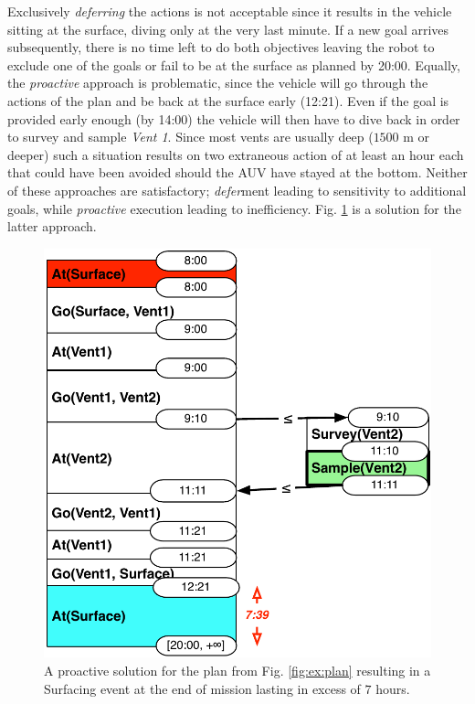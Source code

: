Exclusively {\em deferring} the actions is not acceptable since it
results in the vehicle sitting at the surface, diving only at the very
last minute. If a new goal arrives subsequently, there is no time left
to do both objectives leaving the robot to exclude one of the goals or
fail to be at the surface as planned by 20:00. Equally, the {\em
  proactive} approach is problematic, since the vehicle will go
through the actions of the plan and be back at the surface early
(12:21). Even if the goal is provided early enough (by 14:00) the
vehicle will then have to dive back in order to survey and sample {\em
  Vent 1}.
Since most vents are usually deep ($1500$ m or deeper) such a situation
results on two extraneous action of at least an hour each that could
have been avoided should the AUV have stayed at the bottom.
Neither of these approaches are satisfactory; {\em defer}ment leading 
to sensitivity to additional goals, while \emph{proactive} execution 
leading to inefficiency. Fig. \ref{fig:ex:proactive} is a solution for the latter
approach.



\begin{figure}
  \centering
  \includegraphics[width=0.65\columnwidth]{figs/example_early}
  \vskip-3mm
  \caption{\small A proactive solution for the plan from
    Fig. \ref{fig:ex:plan} resulting in a Surfacing event at the end
    of mission lasting in excess of $7$ hours.}
  \label{fig:ex:proactive}
\end{figure}


